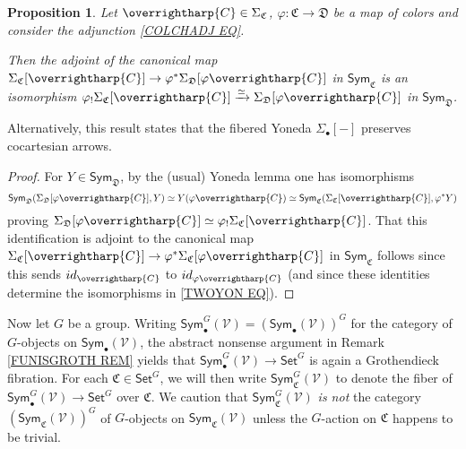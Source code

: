 \documentclass[a4paper,10pt
,draft
]{article}%
\numberwithin{equation}{section}
\numberwithin{figure}{section}
\newtheorem{proposition}[equation]{Proposition}%
\theoremstyle{definition} %
\newcommand{\vect}[1]{\text{\overrightharp{\ensuremath{#1}}}}
\newcommand{\V}{\ensuremath{\mathcal V}}
\newcommand{\1}{\ensuremath{\mathbbm 1}}%
\begin{document}
\begin{proposition}\label{FIBYONPUSH PROP}
Let $\vect{C} \in \Sigma_{\mathfrak{C}}$,
$\varphi \colon \mathfrak{C} \to \mathfrak{D}$
be a map of colors and consider the adjunction \eqref{COLCHADJ EQ}.

Then the adjoint of the canonical map
$\Sigma_{\mathfrak{C}}[\vect{C}]
\to
\varphi^{\**}\Sigma_{\mathfrak{D}}[\varphi\vect{C}]$
in $\mathsf{Sym}_{\mathfrak{C}}$
is an isomorphism
$\varphi_{!} \Sigma_{\mathfrak{C}}[\vect{C}]
\xrightarrow{\simeq}
\Sigma_{\mathfrak{D}}[\varphi\vect{C}]$
in $\mathsf{Sym}_{\mathfrak{D}}$.
\end{proposition}


Alternatively, this result states that 
the fibered Yoneda $\Sigma_{\bullet}[-]$
preserves cocartesian arrows.


\begin{proof}
For $Y \in \mathsf{Sym}_{\mathfrak{D}}$, by the (usual) Yoneda lemma one has isomorphisms
\begin{equation}\label{TWOYON EQ}
\mathsf{Sym}_{\mathfrak{D}}
(\Sigma_{\mathfrak{D}}[\varphi \vect{C}],Y)
\simeq
Y(\varphi \vect{C})
\simeq
\mathsf{Sym}_{\mathfrak{C}}(\Sigma_{\mathfrak{C}}[\vect{C}],\varphi^{\**}Y)
\end{equation}
proving 
$\Sigma_{\mathfrak{D}}[\varphi \vect{C}] \simeq \varphi_! \Sigma_{\mathfrak{C}}[\vect{C}]$.
That this identification is adjoint to the canonical map
$\Sigma_{\mathfrak{C}}[\vect{C}]
\to
\varphi^{\**}\Sigma_{\mathfrak{C}}[\varphi\vect{C}]$
in $\mathsf{Sym}_{\mathfrak{C}}$
follows since this sends
$id_{\vect{C}}$ to $id_{\varphi\vect{C}}$
(and since these identities determine the isomorphisms in \eqref{TWOYON EQ}).
\end{proof}



Now let $G$ be a group. Writing 
$\mathsf{Sym}^G_\bullet(\mathcal{V})
=
\left(\mathsf{Sym}_\bullet(\mathcal{V})\right)^G$
for the category of $G$-objects
on $\mathsf{Sym}_{\bullet}(\V)$,
the abstract nonsense argument in Remark \ref{FUNISGROTH REM}
yields that
$\mathsf{Sym}^G_\bullet(\mathcal{V}) \to \mathsf{Set}^G$
is again a Grothendieck fibration.
For each $\mathfrak{C} \in \mathsf{Set}^G$,
we will then write
$\mathsf{Sym}^G_{\mathfrak{C}}(\V)$
to denote the fiber of
$\mathsf{Sym}^G_\bullet(\mathcal{V}) \to \mathsf{Set}^G$
over $\mathfrak{C}$.
We caution that 
$\mathsf{Sym}^G_{\mathfrak{C}}(\V)$
\emph{is not} the category 
$\left(\mathsf{Sym}_{\mathfrak{C}}(\V)\right)^G$
of $G$-objects on $\mathsf{Sym}_{\mathfrak{C}}(\V)$
unless the $G$-action on $\mathfrak{C}$
happens to be trivial.
\end{document}

